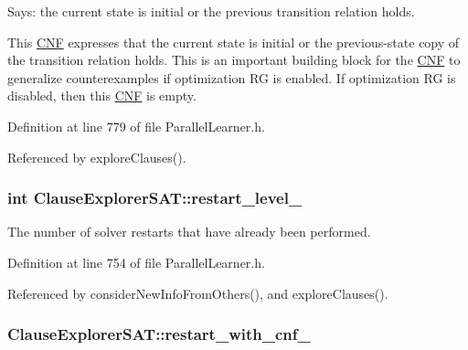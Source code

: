 Says\-: the current state is initial or the previous transition relation holds. 

This \hyperlink{classCNF}{C\-N\-F} expresses that the current state is initial or the previous-\/state copy of the transition relation holds. This is an important building block for the \hyperlink{classCNF}{C\-N\-F} to generalize counterexamples if optimization R\-G is enabled. If optimization R\-G is disabled, then this \hyperlink{classCNF}{C\-N\-F} is empty. 

Definition at line 779 of file Parallel\-Learner.\-h.



Referenced by explore\-Clauses().

\hypertarget{classClauseExplorerSAT_a0b5d716111026dd1cb4efe5855e2fe2f}{
\subsubsection[{restart\-\_\-level\-\_\-}]{\setlength{\rightskip}{0pt plus 5cm}int Clause\-Explorer\-S\-A\-T\-::restart\-\_\-level\-\_\-\hspace{0.3cm}{\ttfamily [protected]}}}\label{classClauseExplorerSAT_a0b5d716111026dd1cb4efe5855e2fe2f}


The number of solver restarts that have already been performed. 



Definition at line 754 of file Parallel\-Learner.\-h.



Referenced by consider\-New\-Info\-From\-Others(), and explore\-Clauses().

\hypertarget{classClauseExplorerSAT_a1a9dc7f76967c8164e9625df34dec172}{
\subsubsection[{restart\-\_\-with\-\_\-cnf\-\_\-}]{ Clause\-Explorer\-S\-A\-T\-::restart\-\_\-with\-\_\-cnf\-\_\-\hspace{0.3cm}{\ttfamily [protected]}}}\label{classClauseExplorerSAT_a1a9dc7f76967c8164e9625df34dec172}


